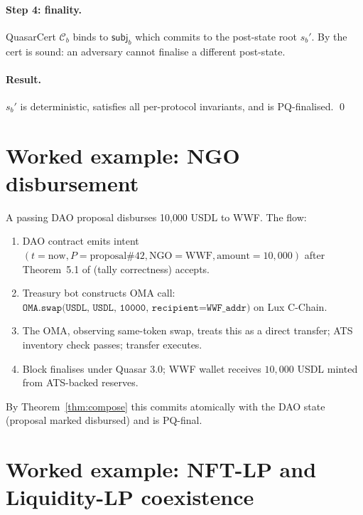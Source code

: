 \documentclass[11pt]{article}
\begin{document}
\paragraph{Step 4: finality.}
QuasarCert $\mathcal{C}_b$ binds to
$\mathsf{subj}_b$ which commits to the post-state root $s_b'$. By
\cite[Theorem 7.5]{quasar-cert} the cert is sound: an adversary
cannot finalise a different post-state.

\paragraph{Result.}
$s_b'$ is deterministic, satisfies all per-protocol invariants,
and is PQ-finalised. \qed

\section{Worked example: NGO disbursement}
\label{sec:example}

A passing DAO proposal disburses 10{,}000 USDL to WWF.  The flow:

\begin{enumerate}[nosep]
  \item DAO contract emits intent
        $(t = \mathrm{now}, P = \mathrm{proposal}\#42,
          \mathrm{NGO}=\text{WWF}, \mathrm{amount}=10{,}000)$
        after Theorem~5.1 of \cite{zoo-dao} (tally correctness)
        accepts.
  \item Treasury bot constructs OMA call:
        $\texttt{OMA.swap(USDL, USDL, 10000, recipient=WWF\_addr)}$
        on Lux C-Chain.
  \item The OMA, observing same-token swap, treats this as a
        direct transfer; ATS inventory check passes; transfer
        executes.
  \item Block finalises under Quasar 3.0; WWF wallet receives
        $10{,}000$ USDL minted from ATS-backed reserves.
\end{enumerate}

By Theorem~\ref{thm:compose} this commits atomically with the DAO
state (proposal marked disbursed) and is PQ-final.

\section{Worked example: NFT-LP and Liquidity-LP coexistence}
\label{sec:coexist}
\end{document}
